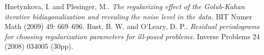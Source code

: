 \documentclass[11pt]{amsart}
\begin{document}
\begin{thebibliography}{1}
	  Hnetynkova, I. and Plesinger, M..
		\emph{The regularizing effect of the Golub-Kahan iterative bidiagonalization and revealing the
             noise level in the data.}
		BIT Numer Math (2009) 49: 669–696.
	 Rust, B. W. and O'Leary, D. P.. 
		\emph{Residual periodograms for choosing regularization parameters for ill-posed problems.}
		Inverse Problems 24 (2008) 034005 (30pp).
\end{thebibliography}
\end{document}
